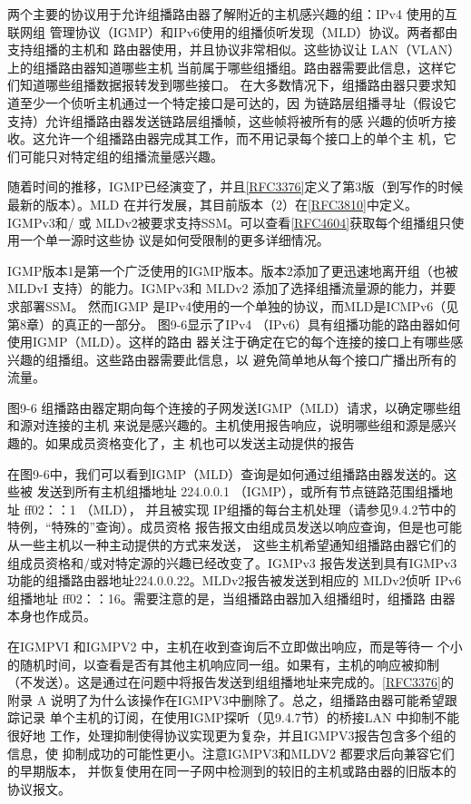 两个主要的协议用于允许组播路由器了解附近的主机感兴趣的组：IPv4 使用的互联网组
管理协议（IGMP）和IPv6使用的组播侦听发现（MLD）协议。两者都由支持组播的主机和
路由器使用，并且协议非常相似。这些协议让 LAN（VLAN）上的组播路由器知道哪些主机
当前属于哪些组播组。路由器需要此信息，这样它们知道哪些组播数据报转发到哪些接口。
在大多数情况下，组播路由器只要求知道至少一个侦听主机通过一个特定接口是可达的，因
为链路层组播寻址（假设它支持）允许组播路由器发送链路层组播帧，这些帧将被所有的感
兴趣的侦听方接收。这允许一个组播路由器完成其工作，而不用记录每个接口上的单个主
机，它们可能只对特定组的组播流量感兴趣。

随着时间的推移，IGMP已经演变了，并且\href{https://www.rfc-editor.org/rfc/rfc3376}{[RFC3376]}定义了第3版（到写作的时候
最新的版本）。MLD
在并行发展，其目前版本（2）在\href{https://www.rfc-editor.org/rfc/rfc3810}{[RFC3810]}中定义。IGMPv3和/
或
MLDv2被要求支持SSM。可以查看\href{https://www.rfc-editor.org/rfc/rfc4604}{[RFC4604]}获取每个组播组只使用一个单一源时这些协
议是如何受限制的更多详细情况。

IGMP版本1是第一个广泛使用的IGMP版本。版本2添加了更迅速地离开组（也被
MLDvI 支持）的能力。IGMPv3和 MLDv2 添加了选择组播流量源的能力，并要求部署SSM。
然而IGMP 是IPv4使用的一个单独的协议，而MLD是ICMPv6（见第8章）的真正的一部分。
图9-6显示了IPv4 （IPv6）具有组播功能的路由器如何使用IGMP（MLD）。这样的路由
器关注于确定在它的每个连接的接口上有哪些感兴趣的组播组。这些路由器需要此信息，以
避免简单地从每个接口广播出所有的流量。

图9-6 组播路由器定期向每个连接的子网发送IGMP（MLD）请求，以确定哪些组和源对连接的主机
来说是感兴趣的。主机使用报告响应，说明哪些组和源是感兴趣的。如果成员资格变化了，主
机也可以发送主动提供的报告

在图9-6中，我们可以看到IGMP（MLD）查询是如何通过组播路由器发送的。这些被
发送到所有主机组播地址 224.0.0.1 （IGMP），或所有节点链路范围组播地址 ff02：：1 （MLD），
并且被实现 IP组播的每台主机处理（请参见9.4.2节中的特例，“特殊的”查询）。成员资格
报告报文由组成员发送以响应查询，但是也可能从一些主机以一种主动提供的方式来发送，
这些主机希望通知组播路由器它们的组成员资格和/或对特定源的兴趣已经改变了。IGMPv3
报告发送到具有IGMPv3功能的组播路由器地址224.0.0.22。MLDv2报告被发送到相应的
MLDv2侦听 IPv6 组播地址 ff02：：16。需要注意的是，当组播路由器加入组播组时，组播路
由器本身也作成员。

\begin{tcolorbox}
  在IGMPVI 和IGMPV2 中，主机在收到查询后不立即做出响应，而是等待一
  个小的随机时间，以查看是否有其他主机响应同一组。如果有，主机的响应被抑制
  （不发送）。这是通过在问题中将报告发送到组组播地址来完成的。\href{https://www.rfc-editor.org/rfc/rfc3376}{[RFC3376]}的附录
  A 说明了为什么该操作在IGMPV3中删除了。总之，组播路由器可能希望跟踪记录
  单个主机的订阅，在使用IGMP探听（见9.4.7节）的桥接LAN 中抑制不能很好地
  工作，处理抑制使得协议实现更为复杂，并且IGMPV3报告包含多个组的信息，使
  抑制成功的可能性更小。注意IGMPV3和MLDV2 都要求后向兼容它们的早期版本，
  并恢复使用在同一子网中检测到的较旧的主机或路由器的旧版本的协议报文。
\end{tcolorbox}

